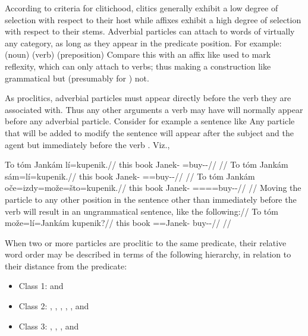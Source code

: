 According to   criteria for clitichood,
clitics generally exhibit a low degree of selection with respect to their host
while affixes exhibit a high degree of selection with respect to their stems.
Adverbial particles can attach to words of virtually any category, as long as
they appear in the predicate position. For example:
\pex
	\a 	{} (noun)
	\a	{} (verb)
	\a 	{} (preposition)
\xe
Compare this with an affix like  used to mark reflexity, which can only
attach to verbs; thus making a construction like  grammatical but  (presumably for ) not.

As proclitics, adverbial particles must appear directly before the verb they are
associated with. Thus any other arguments a verb may have will normally appear
before any adverbial particle. Consider for example a sentence like   Any particle that will be
added to modify the sentence will appear after the subject  and the
agent  but immediately before the verb . Viz.,

\pex
\a
\begingl
	\gla To tóm Jankám lí=kupenik.//
	\glb this book Janek-\Agt{} \Q{}=buy-\Pv{}-\Pf{}//
	\glft {}//
\endgl
\a
\begingl
	\gla To tóm Jankám sám=lí=kupenik.//
	\glb this book Janek-\Agt{} \Excl{}=\Q{}=buy-\Pv{}-\Pf{}//
	\glft {}//
\endgl
\a
\begingl
	\gla To tóm Jankám oče=izdy=može=što=kupenik.//
	\glb this book Janek-\Agt{} \Mir{}=\Infer{}=\Add{}=\Aff{}=buy-\Pv{}-\Pf{}//
	\glft {}//
\endgl
\a
\begingl
	\glpreamble Moving the particle to any other position in the sentence other
	than immediately before the verb will result in an ungrammatical sentence,
	like the following://
	\gla \ljudge{*}To tóm može=lí=Jankám kupenik?//
	\glb this book \Add{}=\Q{}=Janek-\Agt{} buy-\Pv{}-\Pf{}//
	\glft {}//
\endgl
\xe

When two or more particles are proclitic to the same predicate, their relative
word order may be described in terms of the following hierarchy, in relation to
their distance from the predicate:
\begin{itemize}[nosep]
	\item Class 1:  and 
	\item Class 2: , , , , ,
	 and 
	\item Class 3: , , ,  and
\end{itemize}


